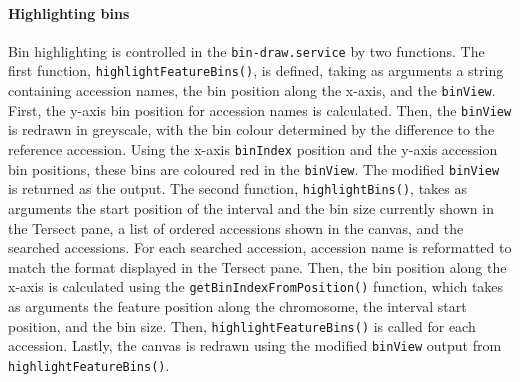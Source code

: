 \documentclass[12pt]{article}
\begin{document}
\paragraph{Highlighting bins}
Bin highlighting is controlled in the \verb+bin-draw.service+ by two functions. The first function, \verb+highlightFeatureBins()+, is defined, taking as arguments a string containing accession names, the bin position along the x-axis, and the \verb+binView+. First, the y-axis bin position for accession names is calculated. Then, the \verb+binView+ is redrawn in greyscale, with the bin colour determined by the difference to the reference accession. Using the x-axis \verb+binIndex+ position and the y-axis accession bin positions, these bins are coloured red in the \verb+binView+. The modified \verb+binView+ is returned as the output. The second function, \verb+highlightBins()+, takes as arguments the start position of the interval and the bin size currently shown in the Tersect pane, a list of ordered accessions shown in the canvas, and the searched accessions. For each searched accession, accession name is reformatted to match the format displayed in the Tersect pane. Then, the bin position along the x-axis is calculated using the \verb+getBinIndexFromPosition()+ function, which takes as arguments the feature position along the chromosome, the interval start position, and the bin size. Then, \verb+highlightFeatureBins()+ is called for each accession. Lastly, the canvas is redrawn using the modified \verb+binView+ output from \verb+highlightFeatureBins()+. 
\end{document}
